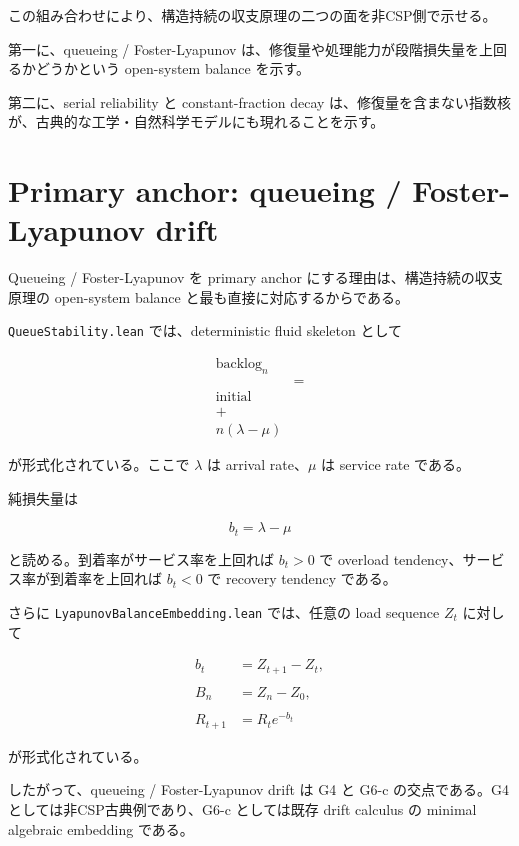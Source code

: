 \documentclass[12pt,a4paper]{article}
\begin{document}
この組み合わせにより、構造持続の収支原理の二つの面を非CSP側で示せる。

第一に、queueing / Foster-Lyapunov は、修復量や処理能力が段階損失量を上回るかどうかという open-system balance を示す。

第二に、serial reliability と constant-fraction decay は、修復量を含まない指数核が、古典的な工学・自然科学モデルにも現れることを示す。

\section{Primary anchor: queueing / Foster-Lyapunov drift}\label{primary-anchor-queueing-foster-lyapunov-drift}

Queueing / Foster-Lyapunov を primary anchor にする理由は、構造持続の収支原理の open-system balance と最も直接に対応するからである。

\texttt{QueueStability.lean} では、deterministic fluid skeleton として

\[
\begin{aligned}
\mathrm{backlog}_n \\
&= \\
\mathrm{initial} \\
+ \\
n(\lambda-\mu)
\end{aligned}
\]

が形式化されている。ここで \(\lambda\) は arrival rate、\(\mu\) は service rate である。

純損失量は

\[
b_{t}=\lambda-\mu
\]

と読める。到着率がサービス率を上回れば \(b_{t}>0\) で overload tendency、サービス率が到着率を上回れば \(b_{t}<0\) で recovery tendency である。

さらに \texttt{LyapunovBalanceEmbedding.lean} では、任意の load sequence \(Z_{t}\) に対して

\[
\begin{aligned}
b_{t}&=Z_{t+1}-Z_{t}, \\
\qquad \\
B_{n}&=Z_{n}-Z_0, \\
\qquad \\
R_{t+1}&=R_{t} e^{-b_{t}}
\end{aligned}
\]

が形式化されている。

したがって、queueing / Foster-Lyapunov drift は G4 と G6-c の交点である。G4 としては非CSP古典例であり、G6-c としては既存 drift calculus の minimal algebraic embedding である。
\end{document}
